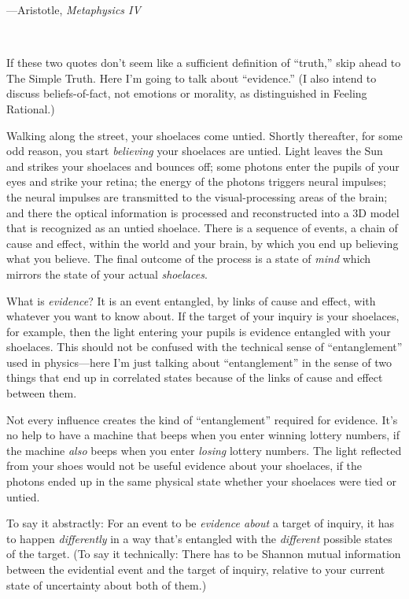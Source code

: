 {\raggedleft
 {}---Aristotle, \textit{Metaphysics IV}
\par}


\bigskip

{
 ~}

{
 If these two quotes don't seem like a sufficient
definition of ``truth,'' skip ahead
to The Simple Truth. Here I'm going to talk about
``evidence.'' (I also intend to
discuss beliefs-of-fact, not emotions or morality, as distinguished in
Feeling Rational.)}

{
 Walking along the street, your shoelaces come untied. Shortly
thereafter, for some odd reason, you start \textit{believing} your
shoelaces are untied. Light leaves the Sun and strikes your shoelaces
and bounces off; some photons enter the pupils of your eyes and strike
your retina; the energy of the photons triggers neural impulses; the
neural impulses are transmitted to the visual-processing areas of the
brain; and there the optical information is processed and reconstructed
into a 3D model that is recognized as an untied shoelace. There is a
sequence of events, a chain of cause and effect, within the world and
your brain, by which you end up believing what you believe. The final
outcome of the process is a state of \textit{mind} which mirrors the
state of your actual \textit{shoelaces}.}

{
 What is \textit{evidence}? It is an event entangled, by links of
cause and effect, with whatever you want to know about. If the target
of your inquiry is your shoelaces, for example, then the light entering
your pupils is evidence entangled with your shoelaces. This should not
be confused with the technical sense of
``entanglement'' used in
physics---here I'm just talking about
``entanglement'' in the sense of two
things that end up in correlated states because of the links of cause
and effect between them.}

{
 Not every influence creates the kind of
``entanglement'' required for
evidence. It's no help to have a machine that beeps
when you enter winning lottery numbers, if the machine \textit{also}
beeps when you enter \textit{losing} lottery numbers. The light
reflected from your shoes would not be useful evidence about your
shoelaces, if the photons ended up in the same physical state whether
your shoelaces were tied or untied.}

{
 To say it abstractly: For an event to be \textit{evidence about} a
target of inquiry, it has to happen \textit{differently} in a way
that's entangled with the \textit{different} possible
states of the target. (To say it technically: There has to be Shannon
mutual information between the evidential event and the target of
inquiry, relative to your current state of uncertainty about both of
them.)}


